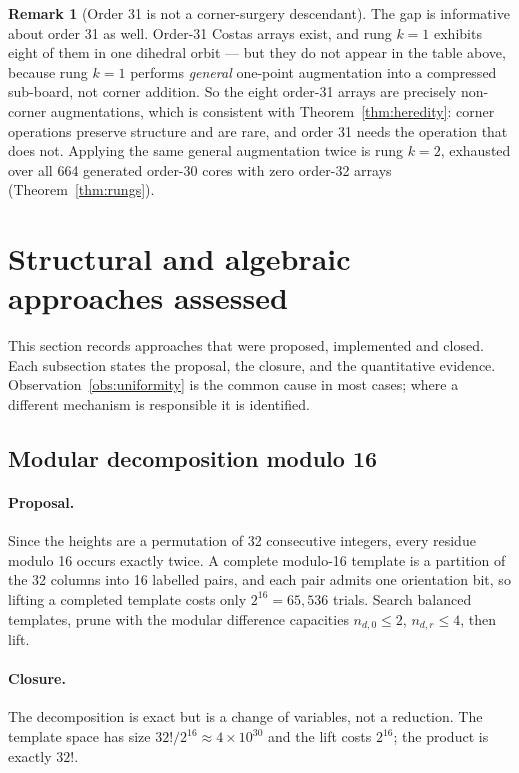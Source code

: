 \documentclass[11pt,a4paper]{article}
\theoremstyle{definition}
\newtheorem{remark}[theorem]{Remark}
\begin{document}
\begin{remark}[Order 31 is not a corner-surgery descendant]
The gap is informative about order 31 as well. Order-31 Costas arrays exist, and
rung $k=1$ exhibits eight of them in one dihedral orbit --- but they do not appear
in the table above, because rung $k=1$ performs \emph{general} one-point
augmentation into a compressed sub-board, not corner addition. So the eight
order-31 arrays are precisely non-corner augmentations, which is consistent with
Theorem~\ref{thm:heredity}: corner operations preserve structure and are rare,
and order 31 needs the operation that does not. Applying the same general
augmentation twice is rung $k=2$, exhausted over all 664 generated order-30 cores
with zero order-32 arrays (Theorem~\ref{thm:rungs}).
\end{remark}

\section{Structural and algebraic approaches assessed}
\label{sec:structural}

This section records approaches that were proposed, implemented and closed. Each
subsection states the proposal, the closure, and the quantitative evidence.
Observation~\ref{obs:uniformity} is the common cause in most cases; where a
different mechanism is responsible it is identified.

\subsection{Modular decomposition modulo 16}
\label{sec:mod16}

\paragraph{Proposal.} Since the heights are a permutation of 32 consecutive
integers, every residue modulo 16 occurs exactly twice. A complete modulo-16
template is a partition of the 32 columns into 16 labelled pairs, and each pair
admits one orientation bit, so lifting a completed template costs only
$2^{16}=65{,}536$ trials. Search balanced templates, prune with the modular
difference capacities $n_{d,0}\le 2$, $n_{d,r}\le 4$, then lift.

\paragraph{Closure.} The decomposition is exact but is a change of variables, not
a reduction. The template space has size $32!/2^{16}\approx 4\times10^{30}$ and
the lift costs $2^{16}$; the product is exactly $32!$.
\end{document}
